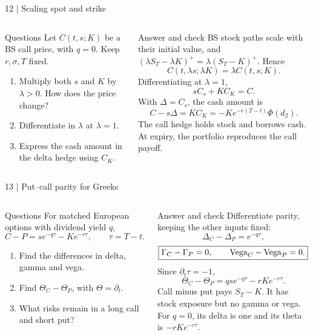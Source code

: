 \documentclass[handout,10pt,t,aspectratio=169]{beamer}
\newenvironment{questions}{\begin{block}{Questions}}{\end{block}}
\newenvironment{answers}{\begin{exampleblock}{Answer and check}}{\end{exampleblock}}
\newcommand{\compact}{\small%
 \setlength{\abovedisplayskip}{3pt}%
 \setlength{\belowdisplayskip}{3pt}%
 \setlength{\abovedisplayshortskip}{2pt}%
 \setlength{\belowdisplayshortskip}{2pt}%
 \setlength{\parskip}{2pt}}
\begin{document}
\begin{frame}{12 | Scaling spot and strike}
\compact
\begin{columns}[T,onlytextwidth]
\begin{questions}
Let \(C(t,s;K)\) be a BS call price, with \(q=0\).
Keep \(r,\sigma,T\) fixed.
\begin{enumerate}
\item Multiply both \(s\) and \(K\) by \(\lambda>0\). How does the price change?
\item Differentiate in \(\lambda\) at \(\lambda=1\).
\item Express the cash amount in the delta hedge using \(C_K\).
\end{enumerate}
\end{questions}
\begin{answers}
BS stock paths scale with their initial value, and
\((\lambda S_T-\lambda K)^+=\lambda(S_T-K)^+\). Hence
\[
 C(t,\lambda s;\lambda K)=\lambda C(t,s;K).
\]
Differentiating at \(\lambda=1\),
\[
 \boxed{sC_s+KC_K=C.}
\]
With \(\Delta=C_s\), the cash amount is
\[
 \boxed{C-s\Delta=KC_K=-Ke^{-r(T-t)}\Phi(d_2).}
\]
The call hedge holds stock and borrows cash. At expiry, the portfolio
reproduces the call payoff.
\end{answers}
\end{columns}
\end{frame}

\begin{frame}{13 | Put--call parity for Greeks}
\compact
\begin{columns}[T,onlytextwidth]
\begin{questions}
For matched European options with dividend yield \(q\),
\[
 C-P=se^{-q\tau}-Ke^{-r\tau},
 \qquad\tau=T-t.
\]
\begin{enumerate}
\item Find the differences in delta, gamma and vega.
\item Find \(\Theta_C-\Theta_P\), with \(\Theta=\partial_t\).
\item What risks remain in a long call and short put?
\end{enumerate}
\end{questions}
\begin{answers}
Differentiate parity, keeping the other inputs fixed:
\[
 \boxed{\Delta_C-\Delta_P=e^{-q\tau},}
\]
\[
 \boxed{\Gamma_C-\Gamma_P=0,\qquad
 {\rm Vega}_C-{\rm Vega}_P=0.}
\]
Since \(\partial_t\tau=-1\),
\[
 \boxed{\Theta_C-\Theta_P=qse^{-q\tau}-rKe^{-r\tau}.}
\]
Call minus put pays \(S_T-K\). It has stock exposure but no gamma or vega.
For \(q=0\), its delta is one and its theta is \(-rKe^{-r\tau}\).
\end{answers}
\end{columns}
\end{frame}
\end{document}
